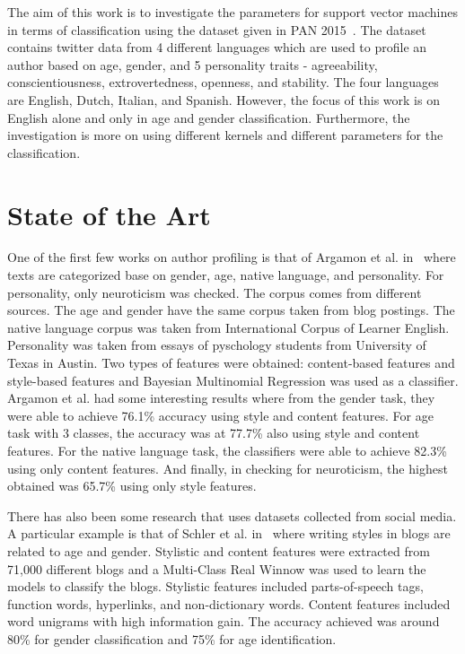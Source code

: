 \documentclass[a4paper]{llncs}
\begin{document}
The aim of this work is to investigate the parameters for support vector machines in terms of classification using the dataset given in PAN 2015~\cite{rangel:2015}. The dataset contains twitter data from 4 different languages which are used to profile an author based on age, gender, and 5 personality traits - agreeability, conscientiousness, extrovertedness, openness, and stability. The four languages are English, Dutch, Italian, and Spanish. However, the focus of this work is on English alone and only in age and gender classification. Furthermore, the investigation is more on using different kernels and different parameters for the classification.

\section{State of the Art}
One of the first few works on author profiling is that of Argamon et al. in~\cite{argamon2009automatically} where texts are categorized base on gender, age, native language, and personality. For personality, only neuroticism was checked. The corpus comes from different sources. The age and gender have the same corpus taken from blog postings. The native language corpus was taken from International Corpus of Learner English. Personality was taken from essays of pyschology students from University of Texas in Austin. Two types of features were obtained: content-based features and style-based features and Bayesian Multinomial Regression was used as a classifier. Argamon et al. had some interesting results where from the gender task, they were able to achieve 76.1\% accuracy using style and content features. For age task with 3 classes, the accuracy was at 77.7\% also using style and content features. For the native language task, the classifiers were able to achieve 82.3\% using only content features. And finally, in checking for neuroticism, the highest obtained was 65.7\% using only style features. 

There has also been some research that uses datasets collected from social media. A particular example is that of Schler et al. in~\cite{schler2006effects} where writing styles in blogs are related to age and gender. Stylistic and content features were extracted from 71,000 different blogs and a Multi-Class Real Winnow was used to learn the models to classify the blogs. Stylistic features included parts-of-speech tags, function words, hyperlinks, and non-dictionary words. Content features included word unigrams with high information gain. The accuracy achieved was around 80\% for gender classification and 75\% for age identification.  
\end{document}
